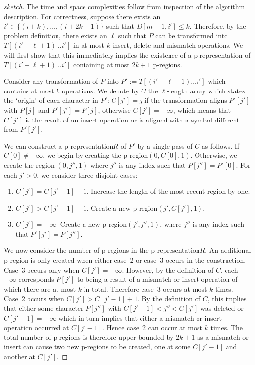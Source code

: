 \documentclass[envcountsame]{llncs}
\renewcommand{\leq}{\leqslant}
\newcommand{\upto}{\ensuremath{\ldots}}
\newcommand{\pregion}{\mbox{p-region}\xspace}
\newcommand{\pregions}{\mbox{p-regions}\xspace}
\newcommand{\prepresentation}{\mbox{p-representation}\xspace}
\begin{document}
\begin{proof}[sketch]
    The time and space complexities follow from inspection of the algorithm description.
For correctness, suppose there exists an $i'\in\{(i+k), \dots, (i+2k-1)\}$ such that $D[m-1,i'] \leq k$. Therefore, by the problem definition, there exists an $\ell$ such that $P$ can be transformed into $T[(i'-\ell+1)\upto i']$ in at most $k$ insert, delete and mismatch operations. We will first show that this immediately implies the existence of a \prepresentation of $T[(i'-\ell+1)\upto i']$ containing at most $2k+1$ \pregions.

    Consider any transformation of $P$ into $P':=T[(i'-\ell+1)\upto i']$ which contains at most $k$ operations. We denote by $C$ the $\ell$-length array which states the `origin' of each character in $P'$: $C[j']=j$ if the transformation aligns $P'[j']$ with $P[j]$ and $P'[j'] = P[j]$, otherwise $C[j']=-\infty$, which means that $C[j']$ is the result of an insert operation or is aligned with a symbol different from $P'[j']$.

    We can construct a \prepresentation $R$ of $P'$ by a single pass of $C$ as follows.
    If $C[0]\neq -\infty$, we begin by creating the \pregion $(0,C[0],1)$. Otherwise, we create the region $(0,j'',1)$ where $j''$ is any index such that $P[j'']=P'[0]$.
    For each $j'>0$, we consider three disjoint cases:

    \begin{enumerate}
        \item $C[j'] = C[j'-1]+1$. Increase the length of the most recent region by one.
        \item $C[j'] > C[j'-1]+1$. Create a new \pregion $(j',C[j'],1)$.
        \item $C[j']=-\infty$. Create a new \pregion $(j',j'',1)$, where $j''$ is any index such that $P'[j']=P[j'']$.
    \end{enumerate}







    We now consider the number of \pregions in the \prepresentation $R$. An additional \pregion is only created when either case~2 or case~3 occurs in the construction. Case~3 occurs only when $C[j']=-\infty$. However, by the definition of $C$, each $-\infty$ corresponds $P[j']$ to being a result of a mismatch or insert operation of which there are at most $k$ in total.
    Therefore case~3 occurs at most $k$ times. Case~2 occurs when $C[j'] > C[j'-1]+1$. By the definition of $C$, this implies that either some character $P[j'']$ with $C[j'-1] < j'' < C[j']$ was deleted or $C[j'-1]= - \infty$ which in turn implies that either a mismatch or insert operation occurred at $C[j'-1]$. Hence case~2 can occur at most $k$ times. The total number of \pregions is therefore upper bounded by $2k+1$ as a mismatch or insert can cause two new p-regions to be created, one at some $C[j'-1]$ and another at $C[j']$.



\end{proof}
\end{document}
